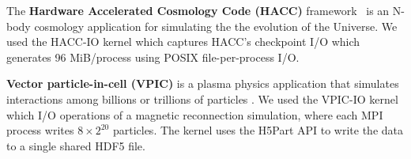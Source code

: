 
The \textbf{Hardware Accelerated Cosmology Code (HACC)} framework~\cite{habib2012} is an N-body cosmology application
for simulating the the evolution of the Universe.
We used the HACC-IO kernel which captures HACC's checkpoint I/O which generates
96 MiB/process 
using POSIX file-per-process I/O.

\textbf{Vector particle-in-cell (VPIC)} is a plasma physics application that simulates interactions among billions or trillions of particles \cite{Bowers2008}.
We used the VPIC-IO kernel which I/O operations of a magnetic reconnection simulation, where each MPI process writes $8 \times 2^{20}$ particles. 
The kernel uses the H5Part API \cite{H5Part} to write the data to a single shared HDF5 file.

